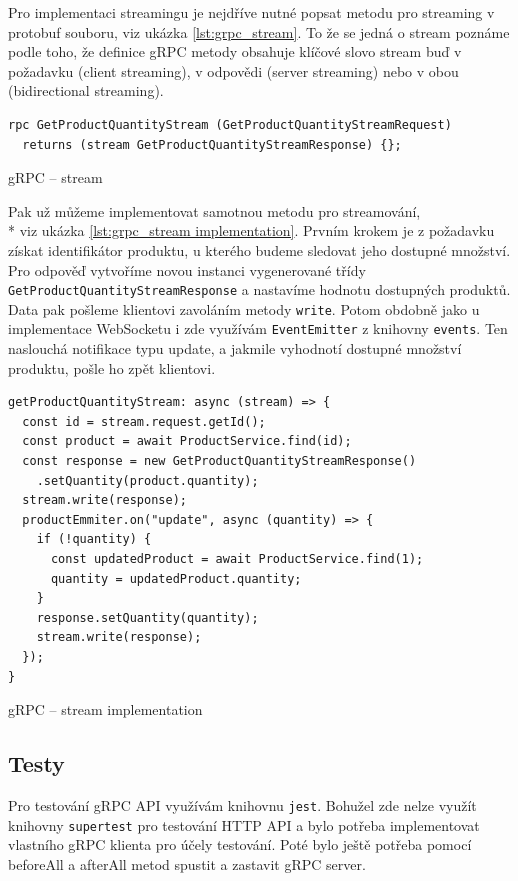 \documentclass[thesis=M,czech]{FITthesis}[2019/12/23]
\begin{document}
Pro implementaci streamingu je nejdříve nutné popsat metodu pro streaming v protobuf souboru, viz ukázka \ref{lst:grpc_stream}. To že se jedná o stream poznáme podle toho, že definice gRPC metody obsahuje klíčové slovo stream buď v požadavku (client streaming), v odpovědi (server streaming) nebo v obou (bidirectional streaming).

\begin{listing}
\begin{verbatim}
rpc GetProductQuantityStream (GetProductQuantityStreamRequest)
  returns (stream GetProductQuantityStreamResponse) {};
\end{verbatim}
\caption{gRPC -- stream}
\label{lst:grpc_stream}
\end{listing}

Pak už můžeme implementovat samotnou metodu pro streamování,\\* viz ukázka \ref{lst:grpc_stream implementation}. Prvním krokem je z požadavku získat identifikátor produktu, u kterého budeme sledovat jeho dostupné množství. Pro odpověď vytvoříme novou instanci vygenerované třídy \texttt{GetProductQuantityStreamResponse} a nastavíme hodnotu dostupných produktů. Data pak pošleme klientovi zavoláním metody \texttt{write}. Potom obdobně jako u implementace WebSocketu i zde využívám \texttt{EventEmitter} z knihovny \texttt{events}. Ten naslouchá notifikace typu update, a jakmile vyhodnotí dostupné množství produktu, pošle ho zpět klientovi.

\begin{listing}[H]
\begin{verbatim}
getProductQuantityStream: async (stream) => {
  const id = stream.request.getId();
  const product = await ProductService.find(id);
  const response = new GetProductQuantityStreamResponse()
    .setQuantity(product.quantity);
  stream.write(response);
  productEmmiter.on("update", async (quantity) => {
    if (!quantity) {
      const updatedProduct = await ProductService.find(1);
      quantity = updatedProduct.quantity;
    }
    response.setQuantity(quantity);
    stream.write(response);
  });
}
\end{verbatim}
\caption{gRPC -- stream implementation}
\label{lst:grpc_stream implementation}
\end{listing}

\subsection{Testy}
Pro testování gRPC API využívám knihovnu \texttt{jest}. Bohužel zde nelze využít knihovny \texttt{supertest} pro testování HTTP API a bylo potřeba implementovat vlastního gRPC klienta pro účely testování. Poté bylo ještě potřeba pomocí beforeAll a afterAll metod spustit a zastavit gRPC server.
\end{document}
